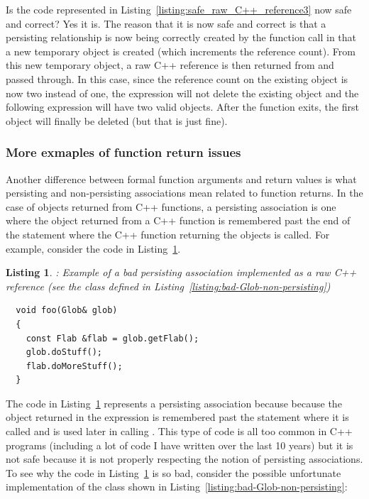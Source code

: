 \documentclass[pdf,ps2pdf,11pt]{SANDreport}
\newtheorem{listing}{Listing}
\begin{document}
Is the code represented in
Listing~\ref{listing:safe_raw_C++_reference3} now safe and correct?
Yes it is.  The reason that it is now safe and correct is that a
persisting relationship is now being correctly created by the function
call {} in that a new temporary {}
object is created (which increments the reference count).  From this
new temporary {} object, a raw C++ reference is then
returned from {} and passed through.  In this
case, since the reference count on the existing {} object is
now two instead of one, the expression {}
will not delete the existing {} object and the following
expression {} will have two valid
{} objects.  After the function
{} exits, the first
{} object will finally be deleted (but that is just fine).


%
{}\subsubsection*{More exmaples of function return issues}
%

Another difference between formal function arguments and return values
is what persisting and non-persisting associations mean related to
function returns.  In the case of objects returned from C++ functions,
a persisting association is one where the object returned from a C++
function is remembered past the end of the statement where the C++
function returning the objects is called.  For example, consider the
code in Listing~\ref{listing:persisting-func-return-1}.


{}\begin{listing}: Example of a bad persisting association
implemented as a raw C++ reference (see the {} class
defined in Listing~\ref{listing:bad-Glob-non-persisting})
\label{listing:persisting-func-return-1}
{\small\begin{verbatim}
  void foo(Glob& glob)
  {
    const Flab &flab = glob.getFlab();
    glob.doStuff();
    flab.doMoreStuff();
  }
\end{verbatim}}
\end{listing}


The code in Listing~\ref{listing:persisting-func-return-1} represents
a persisting association because because the {} object
returned in the expression {} is remembered past the statement where it is
called and is used later in calling {}.  This
type of code is all too common in C++ programs (including a lot of
code I have written over the last 10 years) but it is not safe because
it is not properly respecting the notion of persisting associations.
To see why the code in Listing~\ref{listing:persisting-func-return-1} is so bad, consider the
possible unfortunate implementation of the {} class shown in
Listing~\ref{listing:bad-Glob-non-persisting}:
\end{document}
